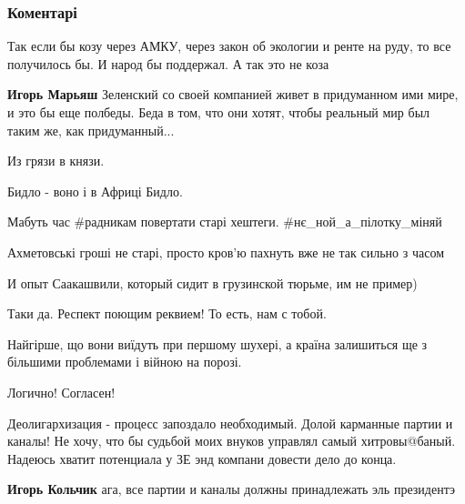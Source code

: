  
 
 
 
 
\subsubsection{Коментарі}

\begin{itemize} %
Так если бы козу через АМКУ, через закон об экологии и ренте на руду, то все получилось бы. И народ бы поддержал.
А так это не коза

\textbf{Игорь Марьяш} Зеленский со своей компанией живет в придуманном ими мире, и это бы еще полбеды. Беда в том, что они хотят, чтобы реальный мир был таким же, как придуманный...

Из грязи в князи.

Бидло - воно і в Африці Бидло.

Мабуть час \#радникам повертати старі хештеги.
\#нє\_ной\_а\_пілотку\_міняй

Ахметовські гроші не старі, просто кров'ю пахнуть вже не так сильно з часом

И опыт Саакашвили, который сидит в грузинской тюрьме, им не пример)


Таки да. Респект поющим реквием! То есть, нам с тобой.

Найгірше, що вони виїдуть при першому шухері, а країна залишиться ще з більшими проблемами і війною на порозі.

Логично! Согласен!


Деолигархизация - процесс запоздало необходимый. Долой карманные партии и
каналы! Не хочу, что бы судьбой моих внуков управлял самый хитровы@баный.
Надеюсь хватит потенциала у ЗЕ энд компани довести дело до конца.

\begin{itemize} %
\textbf{Игорь Кольчик} ага, все партии и каналы должны принадлежать эль президентэ


\end{itemize}
\end{itemize}
